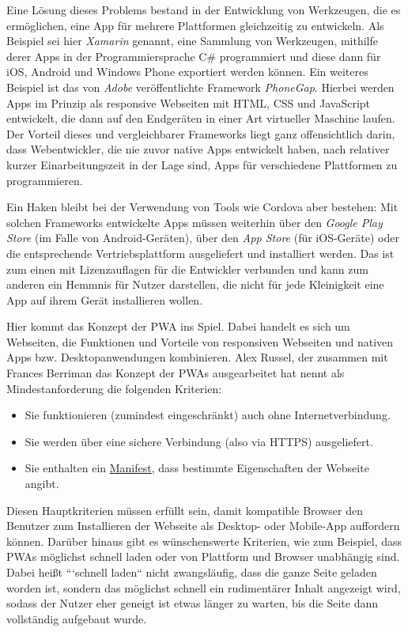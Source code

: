 Eine Lösung dieses Problems bestand in der Entwicklung von  Werkzeugen, die es ermöglichen, eine App für mehrere Plattformen gleichzeitig zu entwickeln. Als Beispiel sei hier \textit{Xamarin}\cite{Xamarin} genannt, eine Sammlung von Werkzeugen, mithilfe derer Apps in der Programmiersprache C\# programmiert und diese dann für iOS, Android und Windows Phone exportiert werden können. Ein weiteres Beispiel ist das von \textit{Adobe} veröffentlichte Framework \textit{PhoneGap}\cite{Phonegapp}. Hierbei werden Apps im Prinzip als responsive Webseiten mit \acs{HTML}, \acs{CSS} und JavaScript entwickelt, die dann auf den Endgeräten in einer Art virtueller Maschine laufen. Der Vorteil dieses und vergleichbarer Frameworks liegt ganz offensichtlich darin, dass Webentwickler, die nie zuvor native Apps entwickelt haben, nach relativer kurzer Einarbeitungszeit in der Lage sind, Apps für verschiedene Plattformen zu programmieren.

Ein Haken bleibt bei der Verwendung von Tools wie Cordova aber bestehen: Mit solchen Frameworks entwickelte Apps müssen weiterhin über den \textit{Google Play Store} (im Falle von Android-Geräten), über den \textit{App Store} (für iOS-Geräte) oder die entsprechende Vertriebsplattform ausgeliefert und installiert werden. Das ist zum einen mit Lizenzauflagen für die Entwickler verbunden und kann zum anderen ein Hemmnis für Nutzer darstellen, die nicht für jede Kleinigkeit eine App auf ihrem Gerät installieren wollen.

Hier kommt das Konzept der \acf{PWA} ins Spiel. Dabei handelt es sich um Webseiten, die Funktionen und Vorteile von responsiven Webseiten und nativen Apps bzw. Desktopanwendungen kombinieren. Alex Russel, der zusammen mit Frances Berriman das Konzept der \acsp{PWA} ausgearbeitet hat nennt als Mindestanforderung die folgenden Kriterien: \cite{PWA}

\begin{itemize}  
\item Sie funktionieren (zumindest eingeschränkt) auch ohne Internetverbindung.
\item Sie werden über eine sichere Verbindung (also via HTTPS) ausgeliefert.
\item Sie enthalten ein \hyperref[sec:technologies:pwa:manifest]{Manifest}, dass bestimmte Eigenschaften der Webseite angibt.
\end{itemize}

Diesen Hauptkriterien müssen erfüllt sein, damit kompatible Browser den Benutzer zum Installieren der Webseite als Desktop- oder Mobile-App auffordern können. Darüber hinaus gibt es wünschenswerte Kriterien, wie zum Beispiel, dass \acsp{PWA} möglichst schnell laden oder von Plattform und Browser unabhängig sind. Dabei heißt ```schnell laden`` nicht zwangsläufig, dass die ganze Seite geladen worden ist, sondern das möglichst schnell ein rudimentärer Inhalt angezeigt wird, sodass der Nutzer eher geneigt ist etwas länger zu warten, bis die Seite dann vollständig aufgebaut wurde.

